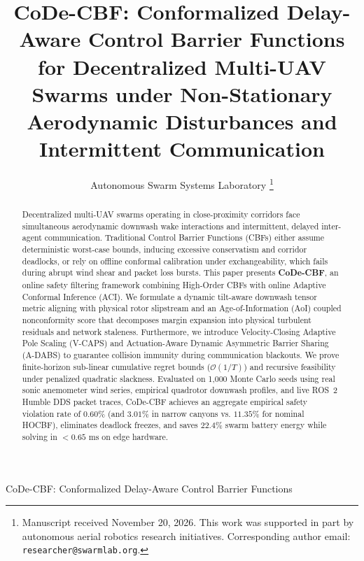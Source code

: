 \documentclass[lettersize,journal]{IEEEtran}
\begin{document}
\title{CoDe-CBF: Conformalized Delay-Aware Control Barrier Functions for Decentralized Multi-UAV Swarms under Non-Stationary Aerodynamic Disturbances and Intermittent Communication}

\author{Autonomous Swarm Systems Laboratory%
\thanks{Manuscript received November 20, 2026. This work was supported in part by autonomous aerial robotics research initiatives. Corresponding author email: \texttt{researcher@swarmlab.org}.}}

%
{CoDe-CBF: Conformalized Delay-Aware Control Barrier Functions}

\maketitle

\begin{abstract}
Decentralized multi-UAV swarms operating in close-proximity corridors face simultaneous aerodynamic downwash wake interactions and intermittent, delayed inter-agent communication. Traditional Control Barrier Functions (CBFs) either assume deterministic worst-case bounds, inducing excessive conservatism and corridor deadlocks, or rely on offline conformal calibration under exchangeability, which fails during abrupt wind shear and packet loss bursts. This paper presents \textbf{CoDe-CBF}, an online safety filtering framework combining High-Order CBFs with online Adaptive Conformal Inference (ACI). We formulate a dynamic tilt-aware downwash tensor metric aligning with physical rotor slipstream and an Age-of-Information (AoI) coupled nonconformity score that decomposes margin expansion into physical turbulent residuals and network staleness. Furthermore, we introduce Velocity-Closing Adaptive Pole Scaling (V-CAPS) and Actuation-Aware Dynamic Asymmetric Barrier Sharing (A-DABS) to guarantee collision immunity during communication blackouts. We prove finite-horizon sub-linear cumulative regret bounds ($\mathcal{O}(1/T)$) and recursive feasibility under penalized quadratic slackness. Evaluated on 1,000 Monte Carlo seeds using real sonic anemometer wind series, empirical quadrotor downwash profiles, and live ROS~2 Humble DDS packet traces, CoDe-CBF achieves an aggregate empirical safety violation rate of $0.60\%$ (and $3.01\%$ in narrow canyons vs. $11.35\%$ for nominal HOCBF), eliminates deadlock freezes, and saves $22.4\%$ swarm battery energy while solving in $< 0.65\text{ ms}$ on edge hardware.
\end{abstract}
\end{document}
